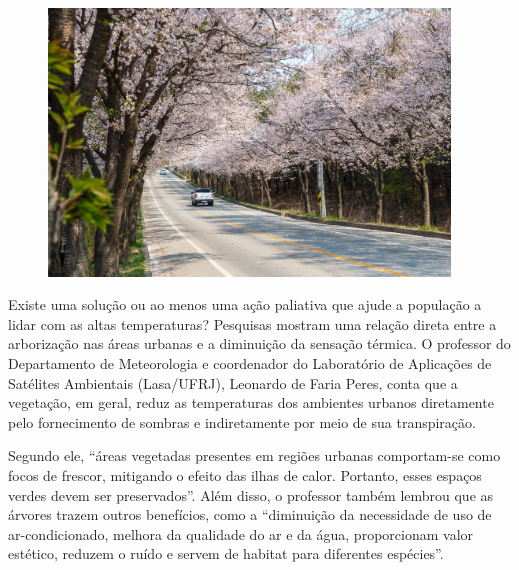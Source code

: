 \begin{myquote}

\begin{figure}[H]
\centering
\includegraphics[width=0.95\textwidth]{./imgSAEB_7_POR/media/image47.png}
\end{figure}

Existe uma solução ou ao menos uma ação paliativa que ajude a população a
lidar com as altas temperaturas? Pesquisas mostram uma relação direta entre a
arborização nas áreas urbanas e a diminuição da sensação térmica. O professor
do Departamento de Meteorologia e coordenador do Laboratório de Aplicações de
Satélites Ambientais (Lasa/UFRJ), Leonardo de Faria Peres, conta que a
vegetação, em geral, reduz as temperaturas dos ambientes urbanos diretamente
pelo fornecimento de sombras e indiretamente por meio de sua transpiração.

Segundo ele, ``áreas vegetadas presentes em regiões urbanas comportam-se como
focos de frescor, mitigando o efeito das ilhas de calor. Portanto, esses
espaços verdes devem ser preservados''. Além disso, o professor também lembrou
que as árvores trazem outros benefícios, como a ``diminuição da necessidade de
uso de ar-condicionado, melhora da qualidade do ar e da água, proporcionam
valor estético, reduzem o ruído e servem de habitat para diferentes espécies''.


\end{myquote}

